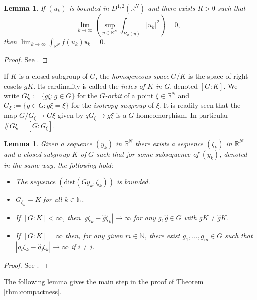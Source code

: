 \documentclass[10pt,letterpaper]{article}
\newtheorem{lemma}[theorem]{Lemma}
\numberwithin{equation}{section}
\def\r{\mathbb{R}}
\def\rn{\mathbb{R}^N}
\def\n{\mathbb{N}}
\def\irn{\int_{\r^N}}
\def\what{\widehat}
\begin{document}
\begin{lemma}\label{lem:lions} 
If $(u_k)$ is bounded in $D^{1,2}(\rn)$ and there exists $R>0$ such that 
$$\lim_{k\to\infty} \left( \sup_{y \in \rn} \int_{B_R(y)} |u_k|^2 \right)=0,$$
then $\lim_{k\to\infty} \irn f(u_k)u_k=0.$
\end{lemma}

\begin{proof}
See \cite[Lemma 3.5]{cm}.
\end{proof}

If $K$ is a closed subgroup of $G$, the \emph{homogeneous space} $G/K$ is the space of right cosets $gK$. Its cardinality is called the \emph{index of $K$ in $G$}, denoted $[G:K]$. We write $G\xi:=\{g\xi:g\in G\}$ for the \emph{$G$-orbit} of a point $\xi\in\rn$ and $G_{\xi}:=\{g\in G:g\xi=\xi\}$ for the \emph{isotropy subgroup} of $\xi$. It is readily seen that the map $G/G_\xi\to G\xi$ given by $gG_\xi\mapsto g\xi$ is a $G$-homeomorphism. In particular $\#G\xi=[G:G_\xi]$.

\begin{lemma} \label{lem:K} 
Given a sequence $(y_k)$ in $\rn$ there exists a sequence $(\zeta_k)$ in $\rn$ and a closed subgroup $K$ of $G$ such that for some subsequence of $(y_k)$, denoted in the same way, the following hold:
\begin{itemize}
\item [$(a)$]The sequence $(\mathrm{dist} (Gy_k,\zeta_k))$ is bounded.
\item[$(b)$] $G_{\zeta_k}= K$ for all $k\in\n$.
\item[$(c)$] If $[G:K]<\infty$, then $|g\zeta_k - \what g \zeta_k|\to\infty$ for any $g,\what g\in G$ with $gK\neq \what g K$.
\item[$(d)$] If $[G:K]=\infty$ then, for any given $m\in\n$, there exist $g_1,\ldots,g_m\in G$ such that $|g_i\zeta_k - \what g_j\zeta_k|\to\infty$ if $i\neq j$.
\end{itemize}
\end{lemma}

\begin{proof}
See \cite[Lemma 3.2]{ccs}.
\end{proof}

The following lemma gives the main step in the proof of Theorem \ref{thm:compactness}.
\end{document}
